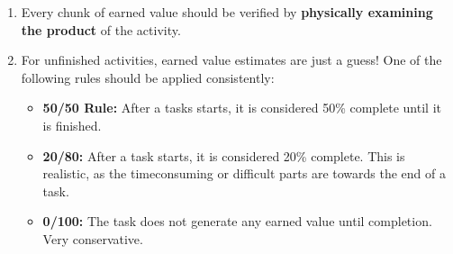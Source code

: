 \documentclass[a4paper, twocolumn]{article}
\begin{document}
\begin{enumerate}
	\item Every chunk of earned value should be verified by \textbf{physically examining the product} of the activity.
	\item For unfinished activities, earned value estimates are just a guess! One of the following rules should be applied consistently:
	\begin{itemize}
		\item \textbf{50/50 Rule:} After a tasks starts, it is considered 50\% complete until it is finished.
		\item \textbf{20/80:} After a task starts, it is considered 20\% complete. This is realistic, as the timeconsuming or difficult parts are towards the end of a task.
		\item \textbf{0/100:} The task does not generate any earned value until completion. Very conservative.
	\end{itemize}
\end{enumerate}
\end{document}
